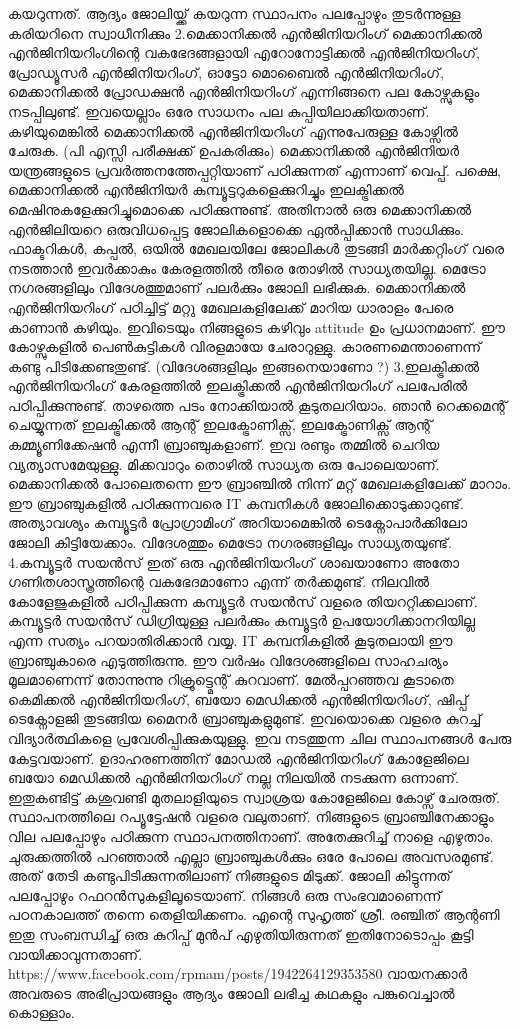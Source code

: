 \documentclass[10pt,a4paper]{report}
\begin{document}
കയറുന്നത്. ആദ്യം ജോലിയ്ക്ക് കയറുന്ന സ്ഥാപനം പലപ്പോഴും തുടര്‍ന്നുള്ള കരിയറിനെ സ്വാധീനിക്കും 2.മെക്കാനിക്കല്‍ എന്‍ജിനിയറിംഗ് മെക്കാനിക്കല്‍ എന്‍ജിനിയറിംഗിന്റെ വകഭേദങ്ങളായി എറോനോട്ടിക്കല്‍ എന്‍ജിനിയറിംഗ്, പ്രോഡ്യൂസര്‍ എന്‍ജിനിയറിംഗ്, ഓട്ടോ മൊബൈല്‍ എന്‍ജിനിയറിംഗ്, മെക്കാനിക്കല്‍ പ്രോഡക്ഷന്‍ എന്‍ജിനിയറിംഗ് എന്നിങ്ങനെ പല കോഴ്സുകളും നടപ്പിലുണ്ട്. ഇവയെല്ലാം ഒരേ സാധനം പല കുപ്പിയിലാക്കിയതാണ്. കഴിയുമെങ്കില്‍ മെക്കാനിക്കല്‍ എന്‍ജിനിയറിംഗ് എന്നുപേരുള്ള കോഴ്സില്‍ ചേരുക. (പി എസ്സി പരീക്ഷക്ക് ഉപകരിക്കും) മെക്കാനിക്കല്‍ എന്‍ജിനിയര്‍ യന്ത്രങ്ങളുടെ പ്രവര്‍ത്തനത്തേപ്പറ്റിയാണ് പഠിക്കുന്നത് എന്നാണ് വെപ്പ്. പക്ഷെ, മെക്കാനിക്കല്‍ എന്‍ജിനിയര്‍ കമ്പ്യൂട്ടറുകളെക്കുറിച്ചും ഇലക്ട്രിക്കല്‍ മെഷിനുകളേക്കുറിച്ചുമൊക്കെ പഠിക്കുന്നുണ്ട്. അതിനാല്‍ ഒരു മെക്കാനിക്കല്‍ എന്‍ജിലിയറെ ഒരുവിധപ്പെട്ട ജോലികളൊക്കെ ഏല്‍പ്പിക്കാന്‍ സാധിക്കും. ഫാക്ടറികൾ, കപ്പൽ, ഒയിൽ മേഖലയിലേ ജോലികൾ തുടങ്ങി മാർക്കറ്റിംഗ് വരെ നടത്താൻ ഇവർക്കാകും കേരളത്തില്‍ തീരെ തോഴില്‍ സാധ്യതയില്ല. മെട്രോ നഗരങ്ങളിലും വിദേശത്തുമാണ് പലര്‍ക്കും ജോലി ലഭിക്കുക. മെക്കാനിക്കല്‍ എന്‍ജിനിയറിംഗ് പഠിച്ചിട്ട് മറ്റു മേഖലകളിലേക്ക് മാറിയ ധാരാളം പേരെ കാണാന്‍ കഴിയും. ഇവിടെയും നിങ്ങളുടെ കഴിവും attitude ഉം പ്രധാനമാണ്. ഈ കോഴ്സുകളിൽ പെൺകുട്ടികൾ വിരളമായേ ചേരാറുള്ളു. കാരണമെന്താണെന്ന് കണ്ടു പിടിക്കേണ്ടതുണ്ട്. (വിദേശങ്ങളിലും ഇങ്ങനെയാണോ ?) 3.ഇലക്ട്രിക്കല്‍ എന്‍ജിനിയറിംഗ് കേരളത്തില്‍ ഇലക്ട്രിക്കല്‍ എന്‍ജിനിയറിംഗ് പലപേരില്‍ പഠിപ്പിക്കുന്നുണ്ട്. താഴത്തെ പടം നോക്കിയാൽ കൂടുതലറിയാം. ഞാന്‍ റെക്കമെന്റ് ചെയ്യുന്നത് ഇലക്ട്രിക്കല്‍ ആന്റ് ഇലക്ട്രോണിക്സ്, ഇലക്ട്രോണിക്സ് ആന്റ് കമ്മ്യൂണിക്കേഷന്‍ എന്നീ ബ്രാഞ്ചുകളാണ്. ഇവ രണ്ടും തമ്മില്‍ ചെറിയ വ്യത്യാസമേയുള്ളു. മിക്കവാറും തൊഴില്‍ സാധ്യത ഒരു പോലെയാണ്. മെക്കാനിക്കല്‍ പോലെതന്നെ ഈ ബ്രാഞ്ചില്‍ നിന്ന് മറ്റ് മേഖലകളിലേക്ക് മാറാം. ഈ ബ്രാഞ്ചുകളില്‍ പഠിക്കുന്നവരെ IT കമ്പനികള്‍ ജോലിക്കൊടുക്കാറുണ്ട്. അത്യാവശ്യം കമ്പ്യൂട്ടര്‍ പ്രോഗ്രാമിംഗ് അറിയാമെങ്കില്‍ ടെക്നോപാര്‍ക്കിലോ ജോലി കിട്ടിയേക്കാം. വിദേശത്തും മെട്രോ നഗരങ്ങളിലും സാധ്യതയുണ്ട്. 4.കമ്പ്യൂട്ടര്‍ സയന്‍സ് ഇത് ഒരു എന്‍ജിനിയറിംഗ് ശാഖയാണോ അതോ ഗണിതശാസ്ത്രത്തിന്റെ വകഭേദമാണോ എന്ന് തര്‍ക്കമുണ്ട്. നിലവില്‍ കോളേജുകളില്‍ പഠിപ്പിക്കുന്ന കമ്പ്യൂട്ടര്‍ സയന്‍സ് വളരെ തിയററ്റിക്കലാണ്. കമ്പ്യൂട്ടര്‍ സയന്‍സ് ഡിഗ്രിയുള്ള പലര്‍ക്കും കമ്പ്യൂട്ടര്‍ ഉപയോഗിക്കാനറിയില്ല എന്ന സത്യം പറയാതിരിക്കാന്‍ വയ്യ. IT കമ്പനികളില്‍ കൂടുതലായി ഈ ബ്രാഞ്ചുകാരെ എടുത്തിരുന്നു. ഈ വര്‍ഷം വിദേശങ്ങളിലെ സാഹചര്യം മൂലമാണെന്ന് തോന്നുന്നു റിക്രൂട്ട്മെന്റ് കുറവാണ്. മേല്‍പ്പറഞ്ഞവ കൂടാതെ കെമിക്കല്‍ എന്‍ജിനിയറിംഗ്, ബയോ മെഡിക്കല്‍ എന്‍ജിനിയറിംഗ്, ഷിപ്പ് ടെക്നോളജി തുടങ്ങിയ മൈനര്‍ ബ്രാഞ്ചുകളുമുണ്ട്. ഇവയൊക്കെ വളരെ കുറച്ച് വിദ്യാര്‍ത്ഥികളെ പ്രവേശിപ്പിക്കുകയുള്ളു. ഇവ നടത്തുന്ന ചില സ്ഥാപനങ്ങള്‍ പേരു കേട്ടവയാണ്. ഉദാഹരണത്തിന് മോഡല്‍ എന്‍ജിനിയറിംഗ് കോളേജിലെ ബയോ മെഡിക്കല്‍ എന്‍ജിനിയറിംഗ് നല്ല നിലയില്‍ നടക്കുന്ന ഒന്നാണ്. ഇതുകണ്ടിട്ട് കശുവണ്ടി മുതലാളിയുടെ സ്വാശ്രയ കോളേജിലെ കോഴ്സ് ചേരരുത്. സ്ഥാപനത്തിലെ റപ്യൂട്ടേഷന്‍ വളരെ വലുതാണ്. നിങ്ങളുടെ ബ്രാഞ്ചിനേക്കാളും വില പലപ്പോഴും പഠിക്കുന്ന സ്ഥാപനത്തിനാണ്. അതേക്കുറിച്ച് നാളെ എഴുതാം. ചുരുക്കത്തില്‍ പറഞ്ഞാല്‍ എല്ലാ ബ്രാ‍ഞ്ചുകള്‍ക്കും ഒരേ പോലെ അവസരമുണ്ട്. അത് തേടി കണ്ടുപിടിക്കുന്നതിലാണ് നിങ്ങളുടെ മിടുക്ക്. ജോലി കിട്ടുന്നത് പലപ്പോഴും റഫറന്‍സുകളിലൂടെയാണ്. നിങ്ങള്‍ ഒരു സംഭവമാണെന്ന് പഠനകാലത്ത് തന്നെ തെളിയിക്കണം. എന്റെ സുഹൃത്ത് ശ്രീ. രഞ്ചിത് ആന്റണി ഇതു സംബന്ധിച്ച് ഒരു കുറിപ്പ് മുന്‍പ് എഴുതിയിരുന്നത് ഇതിനോടൊപ്പം കൂട്ടി വായിക്കാവുന്നതാണ്. https://www.facebook.com/rpmam/posts/1942264129353580 വായനക്കാര്‍ അവരുടെ അഭിപ്രായങ്ങളും ആദ്യം ജോലി ലഭിച്ച കഥകളും പങ്കുവെച്ചാല്‍ കൊള്ളാം.
  
\end{document}
